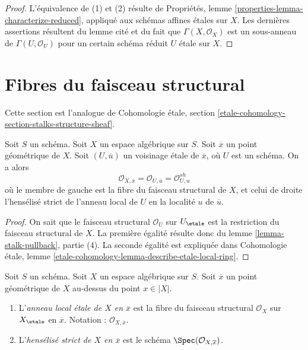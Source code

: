 \begin{proof}
L'équivalence de (1) et (2) résulte de
Propriétés, lemme \ref{properties-lemma-characterize-reduced},
appliqué aux schémas affines \'etales sur $X$. Les dernières assertions
résultent du lemme cité et du fait que $\Gamma(X, \mathcal{O}_X)$ est
un sous-anneau de $\Gamma(U, \mathcal{O}_U)$ pour un certain
schéma réduit $U$ \'etale sur $X$.
\end{proof}







\section{Fibres du faisceau structural}
\label{section-stalks-structure-sheaf}

\noindent
Cette section est l'analogue de
Cohomologie \'etale, section
\ref{etale-cohomology-section-stalks-structure-sheaf}.

\begin{lemma}
\label{lemma-describe-etale-local-ring}
Soit $S$ un schéma.
Soit $X$ un espace algébrique sur $S$.
Soit $\overline{x}$ un point géométrique de $X$.
Soit $(U, \overline{u})$ un voisinage \'etale de $\overline{x}$,
où $U$ est un schéma. On a alors
$$
\mathcal{O}_{X, \overline{x}} =
\mathcal{O}_{U, \overline{u}} =
\mathcal{O}_{U, u}^{sh}
$$
où le membre de gauche est la fibre du faisceau structural de $X$,
et celui de droite l'hensélisé strict de l'anneau local
de $U$ en la localité $u$ de $\overline{u}$.
\end{lemma}

\begin{proof}
On sait que le faisceau structural $\mathcal{O}_U$ sur
$U_\etale$ est la restriction du faisceau structural de $X$.
La première égalité résulte donc du
lemme \ref{lemma-stalk-pullback}, partie (4).
La seconde égalité est expliquée dans
Cohomologie \'etale,
lemme \ref{etale-cohomology-lemma-describe-etale-local-ring}.
\end{proof}

\begin{definition}
\label{definition-etale-local-rings}
Soit $S$ un schéma.
Soit $X$ un espace algébrique sur $S$.
Soit $\overline{x}$ un point géométrique de $X$ au-dessus du point
$x \in |X|$.
\begin{enumerate}
\item L'{\it anneau local \'etale de $X$ en $\overline{x}$}
est la fibre du faisceau structural $\mathcal{O}_X$ sur $X_\etale$
en $\overline{x}$.
Notation : $\mathcal{O}_{X, \overline{x}}$.
\item L'{\it hensélisé strict de $X$ en $\overline{x}$}
est le schéma $\Spec(\mathcal{O}_{X, \overline{x}})$.
\end{enumerate}
\end{definition}

